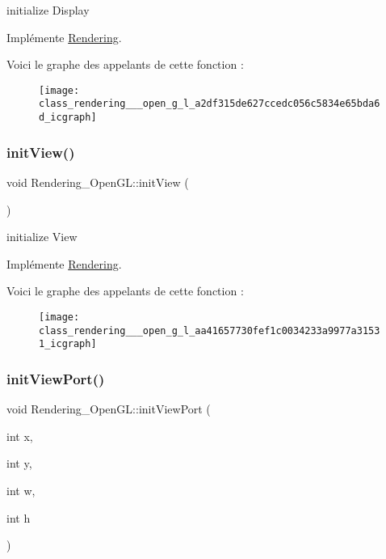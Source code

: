 initialize Display 



Implémente \hyperlink{class_rendering_ae3ad4a7f4c5559cb258d72886123c3e0}{Rendering}.

Voici le graphe des appelants de cette fonction \+:\nopagebreak
\begin{figure}[H]
\begin{center}
\leavevmode
\texttt{[image: class\_rendering\_\_\_open\_g\_l\_a2df315de627ccedc056c5834e65bda6d\_icgraph]}
\end{center}
\end{figure}
\mbox{\label{class_rendering___open_g_l_aa41657730fef1c0034233a9977a31531}} 
\subsubsection{\texorpdfstring{init\+View()}{initView()}}
{\footnotesize\ttfamily void Rendering\+\_\+\+Open\+G\+L\+::init\+View (\begin{DoxyParamCaption}{ }\end{DoxyParamCaption})\hspace{0.3cm}{\ttfamily [virtual]}}



initialize View 



Implémente \hyperlink{class_rendering_abf05def5b7eb02669008cf44c3520dae}{Rendering}.

Voici le graphe des appelants de cette fonction \+:\nopagebreak
\begin{figure}[H]
\begin{center}
\leavevmode
\texttt{[image: class\_rendering\_\_\_open\_g\_l\_aa41657730fef1c0034233a9977a31531\_icgraph]}
\end{center}
\end{figure}
\mbox{\label{class_rendering___open_g_l_ac6c10061853d88c1ab6e40d6c172c69c}} 
\subsubsection{\texorpdfstring{init\+View\+Port()}{initViewPort()}}
{\footnotesize\ttfamily void Rendering\+\_\+\+Open\+G\+L\+::init\+View\+Port (\begin{DoxyParamCaption}\item[{int}]{x,  }\item[{int}]{y,  }\item[{int}]{w,  }\item[{int}]{h }\end{DoxyParamCaption})\hspace{0.3cm}{\ttfamily [virtual]}}



